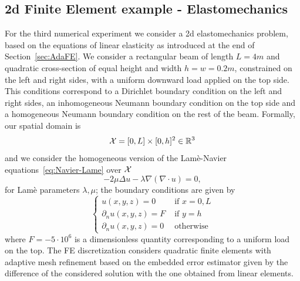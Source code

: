 \subsection{2d Finite Element example - Elastomechanics}\label{sec:FEexp}
For the third numerical experiment we consider a 2d elastomechanics problem, based on the equations of linear elasticity as introduced at the end of Section~\ref{sec:AdaFE}.
We consider a rectangular beam of length $L=4 m$ and quadratic cross-section of equal height and width $h=w=0.2 m$, constrained on the left and right sides, with a uniform downward load applied on the top side.
This conditions correspond to a Dirichlet boundary condition on the left and right sides, an inhomogeneous Neumann boundary condition on the top side and a homogeneous Neumann boundary condition on the rest of the beam.
Formally, our spatial domain is
\[
    \mathcal X = [0,L] \times [0,h] ^2 \in \mathbb{R}^3
\]
and we consider the homogeneous version of the Lamè-Navier equations~\eqref{eq:Navier-Lame} over $\mathcal X$
\[
    -2\mu \Delta u - \lambda \nabla (\nabla \cdot u) = 0,
\]
for Lamè parameters $\lambda, \mu$; the boundary conditions are given by
\[
    \begin{cases}
        u(x,y,z) = 0 & \text{ if } x = 0, L \\
        \partial_n u(x,y,z) = F & \text{ if } y = h \\
        \partial_n u(x,y,z) = 0 & \text{ otherwise}
    \end{cases}
\]
where $F = -5\cdot 10^6$ is a dimensionless quantity corresponding to a uniform load on the top.
The FE discretization considers quadratic finite elements with adaptive mesh refinement based on the embedded error estimator given by the difference of the considered solution with the one obtained from linear elements.\medskip

